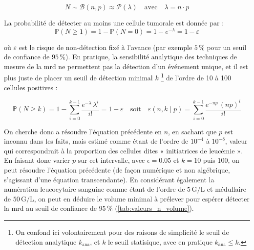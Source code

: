 \begin{equation}
    N \sim \mathcal{B}(n, p) \approx \mathcal{P}(\lambda)
    \quad \text{avec} \quad \lambda = n \cdot p
\end{equation}

La probabilité de détecter au moins une cellule tumorale est donnée par :
\begin{equation}
    \mathbb{P}(N \geq 1) = 1 - \mathbb{P}(N = 0) = 1 - e^{-\lambda} = 1 - \varepsilon
\end{equation}

où $\varepsilon$ est le risque de non-détection fixé à l'avance (par exemple
$5\,\%$ pour un seuil de confiance de $95\,\%$). En pratique, la sensibilité
analytique des techniques de mesure de la \gls{mrd} ne permettent pas la
détection d'un événement unique, et il est plus juste de placer un seuil de
détection minimal $k$ \footnote{On confond ici volontairement pour des raisons
de simplicité le seuil de détection analytique $k_{\text{ana}}$, et $k$ le
seuil statisique, avec en pratique $k_{\text{ana}} \leq k$.} de l'ordre de 10 à
100 cellules positives :

\begin{equation}
    \mathbb{P}(N \geq k) = 1 - \sum_{i = 0}^{k-1} \frac{e^{-\lambda} \, \lambda^{i}}{i!} = 1 - \varepsilon
    \quad \text{soit} \quad \varepsilon(n,k \mid p) = \sum_{i = 0}^{k-1} \frac{e^{-np} \, (np)^{i}}{i!}
\end{equation}

On cherche donc a résoudre l'équation précédente en $n$, en sachant que $p$ est
inconnu dans les faits, mais estimé comme étant de l'ordre de $10^{-4}$ à
$10^{-8}$, valeur qui correspondrait à la proportion des cellules dites «
initiatrices de leucémie ». En faisant donc varier $p$ sur cet intervalle, avec
$\epsilon = 0.05$ et $k = 10$ puis $100$, on peut résoudre l'équation
précédente (de façon numérique et non algébrique, s'agissant d'une équation
transcendante). En considérant également la numération leucocytaire sanguine
comme étant de l'ordre de $5\,\text{G/L}$ et médullaire de $50\,\text{G/L}$, on
peut en déduire le volume minimal à prélever pour espérer détecter la \gls{mrd}
au seuil de confiance de $95\,\%$ (\autoref{tab:valeurs_n_volume}).

